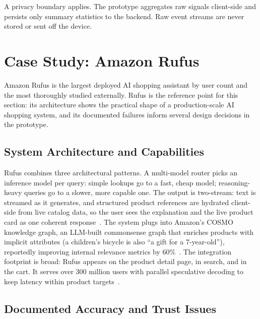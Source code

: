 A privacy boundary applies. The prototype aggregates raw signals
client-side and persists only summary statistics to the backend.
Raw event streams are never stored or sent off the device.

\section{Case Study: Amazon Rufus}
\label{sec:bg-rufus}

Amazon Rufus is the largest deployed AI shopping assistant by
user count and the most thoroughly studied externally. Rufus is
the reference point for this section: its architecture shows the
practical shape of a production-scale AI shopping system, and its
documented failures inform several design decisions in the
prototype.

\subsection{System Architecture and Capabilities}
\label{subsec:bg-rufus-arch}

Rufus combines three architectural patterns. A multi-model router
picks an inference model per query: simple lookups go to a fast,
cheap model; reasoning-heavy queries go to a slower, more capable
one. The output is two-stream: text is streamed as it generates,
and structured product references are hydrated client-side from
live catalog data, so the user sees the explanation and the live
product card as one coherent
response~\cite{RufusTechnology, RufusScaling}. The system plugs
into Amazon's COSMO knowledge graph, an LLM-built commonsense
graph that enriches products with implicit attributes (a
children's bicycle is also ``a gift for a 7-year-old''),
reportedly improving internal relevance metrics by
60\%~\cite{COSMO}. The integration footprint is broad: Rufus
appears on the product detail page, in search, and in the cart.
It serves over 300 million users with parallel speculative
decoding to keep latency within product
targets~\cite{RufusScaling}.

\subsection{Documented Accuracy and Trust Issues}
\label{subsec:bg-rufus-problems}

